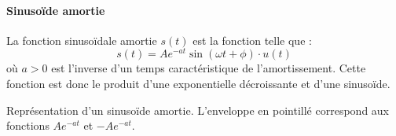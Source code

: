 \paragraph{Sinuso\"ide amortie}
La fonction sinuso\"idale amortie $s(t)$ est la fonction telle que :
\[
    s(t)=Ae^{-at}\sin{(\omega t +\phi)}\cdot u(t)
\]
où $a>0$ est l'inverse d'un temps caractéristique de l'amortissement.
Cette fonction est donc le produit d'une exponentielle décroissante et 
d'une sinuso\"ide.
\begin{marginfigure}[-8em]
    \centering
    \resizebox{\linewidth}{!}{}
    \caption{Représentation d'un sinuso\"ide amortie. L'enveloppe en pointillé 
             correspond aux fonctions $Ae^{-at}$ et $-Ae^{-at}$.
             \label{fig-sin_amor}}
\end{marginfigure}
\newpage
\restoregeometry
